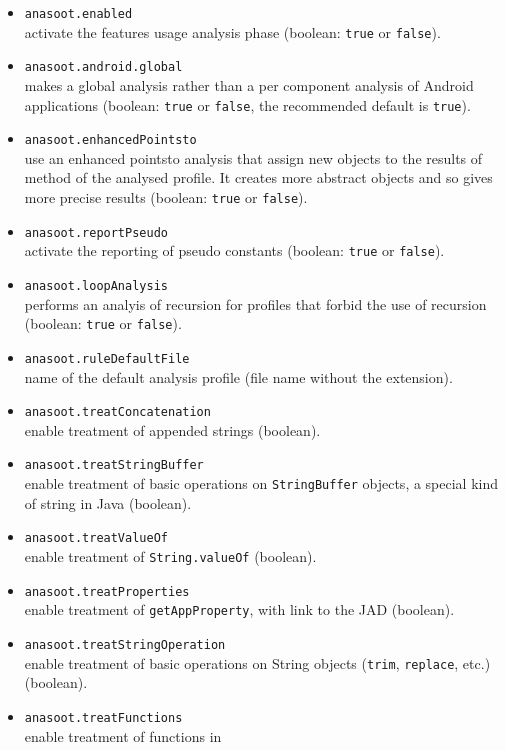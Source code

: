 \begin{itemize}
\item{\texttt{anasoot.enabled}}\\ activate the features usage analysis phase 
  (boolean: \texttt{true} or \texttt{false}).
\item{\texttt{anasoot.android.global}}\\ makes a global analysis rather than a
per component analysis of Android applications (boolean: \texttt{true} or
\texttt{false}, the recommended default is \texttt{true}).
\item{\texttt{anasoot.enhancedPointsto}}\\ use an enhanced pointsto analysis
that assign new objects to the results of method of the analysed profile. It
creates more abstract objects and so gives more precise results (boolean:
\texttt{true} or \texttt{false}).
\item{\texttt{anasoot.reportPseudo}}\\ activate the reporting of pseudo
  constants (boolean: \texttt{true} or \texttt{false}).
\item {\texttt{anasoot.loopAnalysis}}\\ performs an analyis of recursion for
profiles that forbid the use of recursion (boolean: \texttt{true} or
\texttt{false}).
\item{\texttt{anasoot.ruleDefaultFile}}\\ name of the default analysis profile
  (file name without the extension).
\item{\texttt{anasoot.treatConcatenation}}\\ enable treatment of appended
  strings (boolean).
\item{\texttt{anasoot.treatStringBuffer}}\\ enable treatment of basic operations on
  \texttt{StringBuffer} objects, a special kind of string in Java (boolean).
\item{\texttt{anasoot.treatValueOf}}\\ enable treatment of
  \texttt{String.valueOf} (boolean).
\item{\texttt{anasoot.treatProperties}}\\ enable treatment of
  \texttt{getAppProperty}, with link to the JAD (boolean).
\item{\texttt{anasoot.treatStringOperation}}\\ enable treatment of basic
  operations on String objects (\texttt{trim}, \texttt{replace}, etc.) (boolean).
\item{\texttt{anasoot.treatFunctions}}\\ enable treatment of functions in

\end{itemize}

